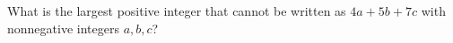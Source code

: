 What is the largest positive integer that cannot be written as $4a+5b+7c$ with nonnegative integers $a,b,c$?
